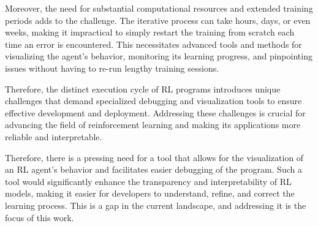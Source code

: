 Moreover, the need for substantial computational resources and extended training 
periods adds to the challenge. The iterative process can take hours, days, or 
even weeks, making it impractical to simply restart the training from scratch 
each time an error is encountered. This necessitates advanced tools and methods 
for visualizing the agent's behavior, monitoring its learning progress, and 
pinpointing issues without having to re-run lengthy training sessions.

Therefore, the distinct execution cycle of RL programs introduces unique 
challenges that demand specialized debugging and visualization tools to ensure 
effective development and deployment. Addressing these challenges is crucial 
for advancing the field of reinforcement learning and making its applications 
more reliable and interpretable.

Therefore, there is a pressing need for a tool that allows for the visualization 
of an RL agent's behavior and facilitates easier debugging of the program. 
Such a tool would significantly enhance the transparency and interpretability 
of RL models, making it easier for developers to understand, refine, and correct 
the learning process. This is a gap in the current landscape, and addressing it 
is the focus of this work.

\endinput

